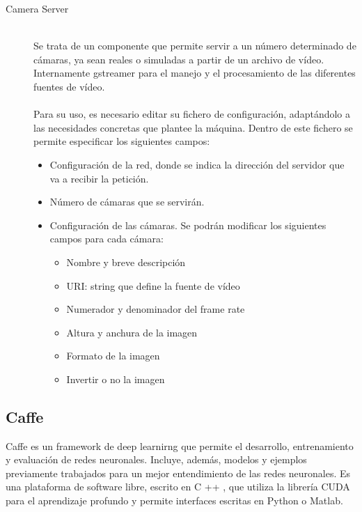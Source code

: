 \begin{description}
\item[Camera Server] \hfill 
\vspace{10pt}
\\
Se trata de un componente que permite servir a un número determinado de cámaras, ya sean reales o simuladas a partir de un archivo de vídeo. Internamente gstreamer para el manejo y el procesamiento de las diferentes fuentes de vídeo.\\
\vspace{-10pt}
\\
Para su uso, es necesario editar su fichero de configuración, adaptándolo a las necesidades concretas que plantee la máquina. Dentro de este fichero se permite especificar los siguientes campos:\\
\vspace{-20pt}
\begin{itemize}
    \item Configuración de la red, donde se indica la dirección del servidor que va a recibir la petición.
    \item Número de cámaras que se servirán.
    \item Configuración de las cámaras. Se podrán modificar los siguientes campos para cada cámara:
    \begin{itemize}
         \item Nombre y breve descripción
         \item URI: string que define la fuente de vídeo
     	 \item Numerador y denominador del frame rate
         \item Altura y anchura de la imagen
         \item Formato de la imagen
         \item Invertir o no la imagen 
    \end{itemize}
\end{itemize}
\end{description}

\subsection{Caffe}\label{sec.caffe}
Caffe \cite{jia2014caffe} es un framework de deep learnirng que permite el desarrollo, entrenamiento y evaluación de redes neuronales. Incluye, además, modelos y ejemplos previamente trabajados para un mejor entendimiento de las redes neuronales. Es una plataforma de software libre, escrito en C ++ ,  que utiliza la librería CUDA para el aprendizaje profundo y permite interfaces escritas en Python o Matlab.\\ 

